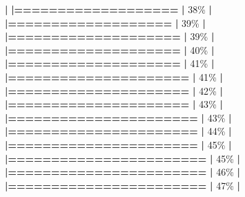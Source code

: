 \documentclass[
]{book}
\newenvironment{Shaded}{\begin{snugshade}}{\end{snugshade}}
\newcommand{\DecValTok}[1]{\textcolor[rgb]{0.00,0.00,0.81}{#1}}
\newcommand{\ErrorTok}[1]{\textcolor[rgb]{0.64,0.00,0.00}{\textbf{#1}}}
\newcommand{\NormalTok}[1]{#1}
\newcommand{\SpecialCharTok}[1]{\textcolor[rgb]{0.81,0.36,0.00}{\textbf{#1}}}
\begin{document}
\begin{Shaded}
\begin{Highlighting}[]
  \SpecialCharTok{|}                                                        
  \ErrorTok{|===================}                               \ErrorTok{|}  \DecValTok{38}\NormalTok{\%}
  \SpecialCharTok{|}                                                        
  \ErrorTok{|===================}                               \ErrorTok{|}  \DecValTok{39}\NormalTok{\%}
  \SpecialCharTok{|}                                                        
  \ErrorTok{|====================}                              \ErrorTok{|}  \DecValTok{39}\NormalTok{\%}
  \SpecialCharTok{|}                                                        
  \ErrorTok{|====================}                              \ErrorTok{|}  \DecValTok{40}\NormalTok{\%}
  \SpecialCharTok{|}                                                        
  \ErrorTok{|====================}                              \ErrorTok{|}  \DecValTok{41}\NormalTok{\%}
  \SpecialCharTok{|}                                                        
  \ErrorTok{|=====================}                             \ErrorTok{|}  \DecValTok{41}\NormalTok{\%}
  \SpecialCharTok{|}                                                        
  \ErrorTok{|=====================}                             \ErrorTok{|}  \DecValTok{42}\NormalTok{\%}
  \SpecialCharTok{|}                                                        
  \ErrorTok{|=====================}                             \ErrorTok{|}  \DecValTok{43}\NormalTok{\%}
  \SpecialCharTok{|}                                                        
  \ErrorTok{|======================}                            \ErrorTok{|}  \DecValTok{43}\NormalTok{\%}
  \SpecialCharTok{|}                                                        
  \ErrorTok{|======================}                            \ErrorTok{|}  \DecValTok{44}\NormalTok{\%}
  \SpecialCharTok{|}                                                        
  \ErrorTok{|======================}                            \ErrorTok{|}  \DecValTok{45}\NormalTok{\%}
  \SpecialCharTok{|}                                                        
  \ErrorTok{|=======================}                           \ErrorTok{|}  \DecValTok{45}\NormalTok{\%}
  \SpecialCharTok{|}                                                        
  \ErrorTok{|=======================}                           \ErrorTok{|}  \DecValTok{46}\NormalTok{\%}
  \SpecialCharTok{|}                                                        
  \ErrorTok{|=======================}                           \ErrorTok{|}  \DecValTok{47}\NormalTok{\%}
  \SpecialCharTok{|}                                                        

\end{Highlighting}
\end{Shaded}
\end{document}

